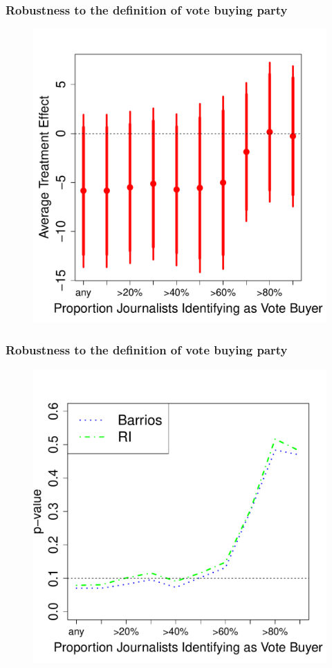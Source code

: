 \documentclass{beamer}
\begin{document}
\begin{frame}
\frametitle{Robustness to the definition of vote buying party}

\begin{figure}
\centering
\includegraphics[width=.6\textwidth]{../Figures/coef_journo_defn}
\end{figure}

\end{frame}



\begin{frame}
\frametitle{Robustness to the definition of vote buying party}
\begin{figure}
\centering
\includegraphics[width=.6\textwidth]{../Figures/p_journo_defn}
\end{figure}
\end{frame}
\end{document}
